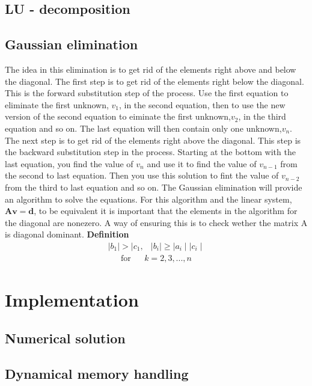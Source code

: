 \documentclass[norsk]{article}
\begin{document}
\subsection{LU - decomposition}
\subsection{Gaussian elimination}
The idea in this elimination is to get rid of the elements right above and below the diagonal.
The first step is to get rid of the elements right below the diagonal. This is the forward substitution step of the process. Use the first equation to eliminate the first unknown, $v_1$, in the second equation, then to use the new version of the second equation to eiminate the first unknown,$v_2$, in the third equation and so on. The last equation will then contain only one unknown,$v_n$. \newline
The next step is to get rid of the elements right above the diagonal. This step is the backward substitution step in the process. Starting at the bottom with the last equation, you find the value of $v_n$ and use it to find the value of $v_{n-1}$ from the second to last equation. Then you use this solution to fint the value of $v_{n-2}$ from the third to last equation and so on.  \newline
The Gaussian elimination will provide an algorithm to solve the equations. For this algorithm and the linear system, $\mathbf{Av}=\mathbf{d}$, to be equivalent it is important that the elements in the algorithm for the diagonal are nonezero. A way of ensuring this is to check wether the matrix A is diagonal dominant. \newline
\textbf{Definition} \newline
\begin{align}
{\mid b_1 \mid >\mid c_1,}&{\mid b_i\mid \geq \mid a_i\mid \mid c_i\mid}
\end{align} 
\begin{align}
{\text{for}}&
&{ k=2,3,...,n}
\end{align}
\section{Implementation}
\subsection{Numerical solution}
\subsection{Dynamical memory handling}
\end{document}
